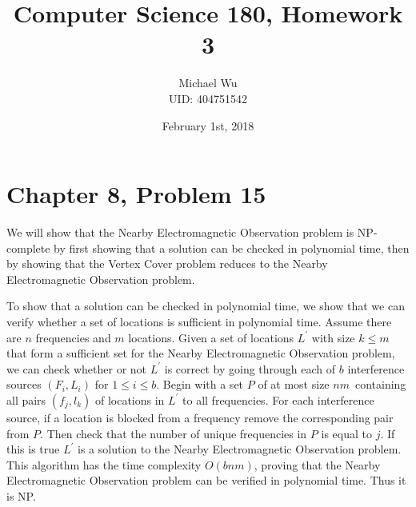 \documentclass[12pt]{article}
\begin{document}
\title{Computer Science 180, Homework 3}
\date{February 1st, 2018}
\author{Michael Wu\\UID: 404751542}
\maketitle

\section*{Chapter 8, Problem 15}

We will show that the Nearby Electromagnetic Observation problem is NP-complete by first showing
that a solution can be checked in polynomial time, then by showing that the Vertex Cover problem reduces
to the Nearby Electromagnetic Observation problem.

To show that a solution can be checked in polynomial time, we show that we can verify whether a set of locations is
sufficient in polynomial time. Assume there are \(n\) frequencies and \(m\) locations.
Given a set of locations \(L^\prime\) with size \(k\leq m\) that form a sufficient set for the Nearby Electromagnetic Observation problem, we can
check whether or not \(L^\prime\) is correct by going through each of \(b\) interference sources \((F_i, L_i)\) for \(1\leq i\leq b\).
Begin with a set \(P\) of at most size \(nm\)\ containing all pairs \((f_j, l_k)\) of locations in \(L^\prime\) to all frequencies.
For each interference source, if a location is blocked from a frequency remove the corresponding pair from \(P\).
Then check that the number of unique frequencies in \(P\) is equal to \(j\). If this is true \(L^\prime\) is a solution
to the Nearby Electromagnetic Observation problem. This algorithm has the time complexity \(O(bnm)\), proving that the
Nearby Electromagnetic Observation problem can be verified in polynomial time. Thus it is NP.
\end{document}
